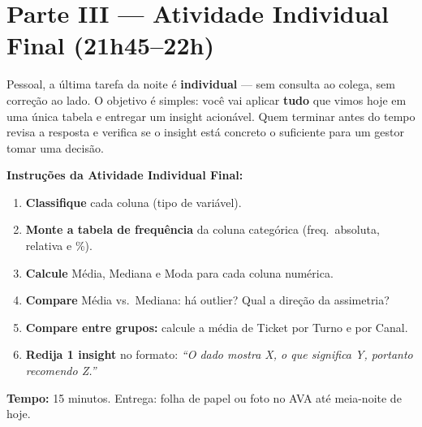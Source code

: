 \section{Parte III — Atividade Individual Final (21h45–22h)}

Pessoal, a última tarefa da noite é \textbf{individual} — sem consulta ao
colega, sem correção ao lado. O objetivo é simples: você vai aplicar
\textbf{tudo} que vimos hoje em uma única tabela e entregar um insight acionável.
Quem terminar antes do tempo revisa a resposta e verifica se o insight está
concreto o suficiente para um gestor tomar uma decisão.

\begin{SolvedBox}
\textbf{Instruções da Atividade Individual Final:}
\begin{enumerate}
  \item \textbf{Classifique} cada coluna (tipo de variável).
  \item \textbf{Monte a tabela de frequência} da coluna categórica (freq.\ absoluta, relativa e \%).
  \item \textbf{Calcule} Média, Mediana e Moda para cada coluna numérica.
  \item \textbf{Compare} Média vs.\ Mediana: há outlier? Qual a direção da assimetria?
  \item \textbf{Compare entre grupos:} calcule a média de Ticket por Turno e por Canal.
  \item \textbf{Redija 1 insight} no formato: \emph{``O dado mostra X, o que significa Y,
  portanto recomendo Z.''}
\end{enumerate}
\textbf{Tempo:} 15 minutos. Entrega: folha de papel ou foto no AVA até meia-noite de hoje.
\end{SolvedBox}

